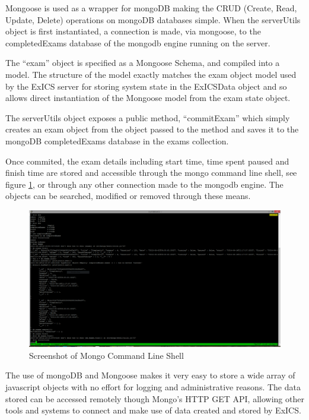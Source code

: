 Mongoose\cite{mongoose} is used as a wrapper for mongoDB making the CRUD (Create, Read, Update, Delete) operations on mongoDB databases simple.  When the serverUtils object is first instantiated, a connection is made, via mongoose, to the completedExams database of the mongodb engine running on the server.

The ``exam'' object is specified as a Mongoose Schema\cite{mongooseSchemas}, and compiled into a model.  The structure of the model exactly matches the exam object model used by the ExICS server for storing system state in the ExICSData object and so allows direct instantiation of the Mongoose model from the exam state object.

The serverUtils object exposes a public method, ``commitExam'' which simply creates an exam object from the object passed to the method and saves it to the mongoDB completedExams database in the exams collection.

Once commited, the exam details including start time, time spent paused and finish time are stored and accessible through the mongo command line shell, see figure \ref{fig:exics_mongo_shell}, or through any other connection made to the mongodb engine.  The objects can be searched, modified or removed through these means.

\begin{figure}
	\centering
	\includegraphics[width=\textwidth]{"screenshots/mongo"}
	\caption{Screenshot of Mongo Command Line Shell}
	\label{fig:exics_mongo_shell}
\end{figure}

The use of mongoDB and Mongoose makes it very easy to store a wide array of javascript objects with no effort for logging and administrative reasons.  The data stored can be accessed remotely though Mongo's HTTP GET API, allowing other tools and systems to connect and make use of data created and stored by ExICS.

